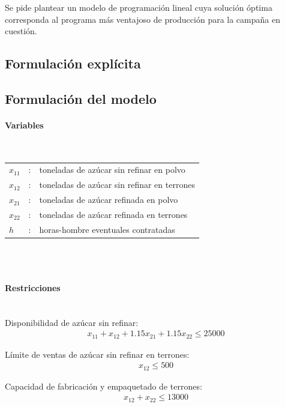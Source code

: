 Se pide plantear un modelo de programación lineal cuya solución óptima corresponda al programa más ventajoso de producción para la campaña en cuestión.

\subsection{Formulación explícita}

\subsection{Formulación del modelo}

\paragraph{Variables}\mbox{}\\

\begin{tabular}{l c l}
    $x_{11}$ & : & toneladas de azúcar sin refinar en polvo \\
    $x_{12}$ & : & toneladas de azúcar sin refinar en terrones \\
    $x_{21}$ & : & toneladas de azúcar refinada en polvo \\
    $x_{22}$ & : & toneladas de azúcar refinada en terrones \\
    $h$      & : & horas-hombre eventuales contratadas \\
\end{tabular}
\\
\\

\paragraph{Restricciones}\mbox{}\\

Disponibilidad de azúcar sin refinar:  
\begin{align} 
x_{11} + x_{12} + 1.15x_{21} + 1.15x_{22} \leq 25000 
\end{align}

Límite de ventas de azúcar sin refinar en terrones:  
\begin{align}
x_{12} \leq 500
\end{align}

Capacidad de fabricación y empaquetado de terrones:  
\begin{align}
x_{12} + x_{22} \leq 13000
\end{align}

